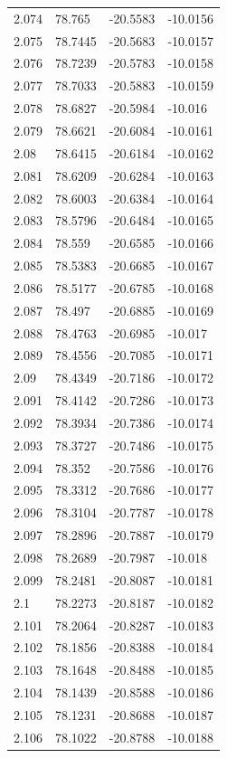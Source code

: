 \begin{tabular}{llll}
2.074 & 78.765 & -20.5583 & -10.0156 \\
2.075 & 78.7445 & -20.5683 & -10.0157 \\
2.076 & 78.7239 & -20.5783 & -10.0158 \\
2.077 & 78.7033 & -20.5883 & -10.0159 \\
2.078 & 78.6827 & -20.5984 & -10.016 \\
2.079 & 78.6621 & -20.6084 & -10.0161 \\
2.08 & 78.6415 & -20.6184 & -10.0162 \\
2.081 & 78.6209 & -20.6284 & -10.0163 \\
2.082 & 78.6003 & -20.6384 & -10.0164 \\
2.083 & 78.5796 & -20.6484 & -10.0165 \\
2.084 & 78.559 & -20.6585 & -10.0166 \\
2.085 & 78.5383 & -20.6685 & -10.0167 \\
2.086 & 78.5177 & -20.6785 & -10.0168 \\
2.087 & 78.497 & -20.6885 & -10.0169 \\
2.088 & 78.4763 & -20.6985 & -10.017 \\
2.089 & 78.4556 & -20.7085 & -10.0171 \\
2.09 & 78.4349 & -20.7186 & -10.0172 \\
2.091 & 78.4142 & -20.7286 & -10.0173 \\
2.092 & 78.3934 & -20.7386 & -10.0174 \\
2.093 & 78.3727 & -20.7486 & -10.0175 \\
2.094 & 78.352 & -20.7586 & -10.0176 \\
2.095 & 78.3312 & -20.7686 & -10.0177 \\
2.096 & 78.3104 & -20.7787 & -10.0178 \\
2.097 & 78.2896 & -20.7887 & -10.0179 \\
2.098 & 78.2689 & -20.7987 & -10.018 \\
2.099 & 78.2481 & -20.8087 & -10.0181 \\
2.1 & 78.2273 & -20.8187 & -10.0182 \\
2.101 & 78.2064 & -20.8287 & -10.0183 \\
2.102 & 78.1856 & -20.8388 & -10.0184 \\
2.103 & 78.1648 & -20.8488 & -10.0185 \\
2.104 & 78.1439 & -20.8588 & -10.0186 \\
2.105 & 78.1231 & -20.8688 & -10.0187 \\
2.106 & 78.1022 & -20.8788 & -10.0188 \\

\end{tabular}
